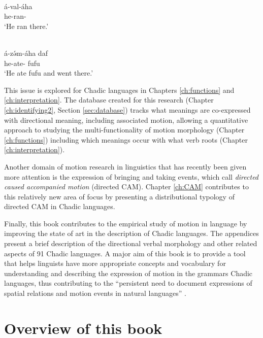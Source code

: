 \ea\label{ex:zulg4}
 \\
\gll á-val-áha \\
he-ran- \\
\glt `He ran there.'

\ex\label{ex:zulg6b}
 \\
\gll á-zə́m-áha daf \\
he-ate- fufu \\
\glt `He ate fufu and went there.'
\z 

This issue is explored for Chadic languages in Chapters \ref{ch:functions} and \ref{ch:interpretation}. The database created for this research (Chapter \ref{ch:identifying2}, Section \ref{sec:database}) tracks what meanings are co-expressed with directional meaning, including associated motion, allowing a quantitative approach to studying the multi-functionality of motion morphology (Chapter \ref{ch:functions}) including which meanings occur with what verb roots (Chapter \ref{ch:interpretation}).

Another domain of motion research in linguistics that has recently been given more attention is the expression of bringing and taking events, which \citet{margettsCausedAccompaniedMotion2022} call \textit{directed caused accompanied motion} (directed CAM). Chapter \ref{ch:CAM} contributes to this relatively new area of focus by presenting a distributional typology of directed CAM in Chadic languages. 

Finally, this book contributes to the empirical study of motion in language by improving the state of art in the description of Chadic languages. The appendices present a brief description of the directional verbal morphology and other related aspects of 91 Chadic languages. A major aim of this book is to provide a tool that helps linguists have more appropriate concepts and vocabulary for understanding and describing the expression of motion in the grammars Chadic languages, thus contributing to the ``persistent need to document expressions of spatial relations and motion events in natural languages'' \citep[14]{robbersOrientationMotionWorld2023}. 

\section{Overview of this book} \label{sec:overview}

